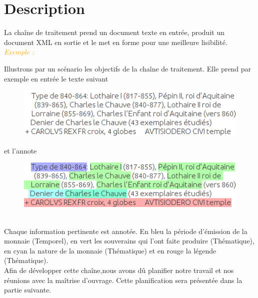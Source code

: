 \documentclass[a4paper, 11pt]{report}
\newenvironment{exemple}
    {
    \textit{\textcolor{orange}{
    Exemple : \\}}
    }
    {~\\
    }
\begin{document}
	\section{Description}
	La chaîne de traitement prend un document texte en entrée, produit un document XML en sortie et le met en forme pour une meilleure lisibilité.\\
	\begin{exemple}
\noindent Illustrons par un scénario les objectifs de la chaîne de traitement.
Elle prend par exemple en entrée le texte suivant

\begin{figure}[h!]
\centering
\includegraphics[scale=.5]{img/exemple_text.png}
\end{figure}

et l'annote
\end{exemple}
\begin{figure}[h!]
\centering
\includegraphics[scale=.5]{img/exemple_text_ann.png} 
\end{figure}\\
Chaque information pertinente est annotée. En bleu la période d'émission de la monnaie (Temporel), en vert les souverains qui l'ont faite produire (Thématique), en cyan la nature de la monnaie (Thématique) et en rouge la légende (Thématique).\\
Afin de développer cette chaîne,nous avons dû planifier notre travail et nos réunions avec la maîtrise d'ouvrage. Cette planification sera présentée dans la partie suivante.
\end{document}
